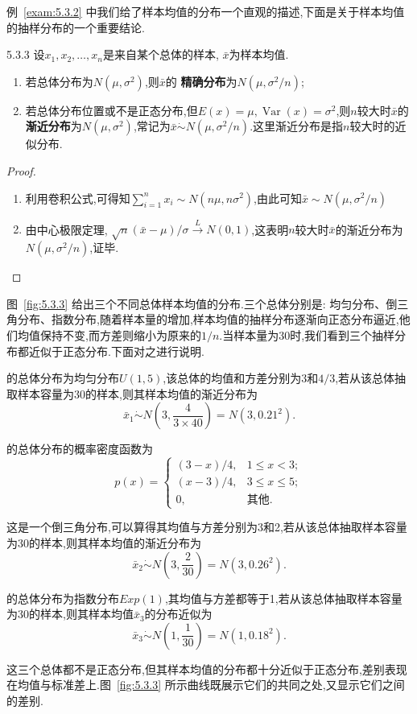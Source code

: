 例~\ref{exam:5.3.2} 中我们给了样本均值的分布一个直观的描述,下面是关于样本均值的抽样分布的一个重要结论.
\begin{theorem}{}{5.3.3}
设$x_1,x_2,\dotsc,x_n$是来自某个总体的样本, $\bar x$为样本均值.
\begin{enumerate}
\item 若总体分布为$N(\mu,\sigma^2)$,则$\bar x$的 \textbf{精确分布}为$N(\mu,\sigma^2/n)$;
\item 若总体分布位置或不是正态分布,但$E(x)=\mu,\operatorname{Var}(x)=\sigma^2$,则$n$较大时$\bar x$的 \textbf{渐近分布}为$N(\mu,\sigma^2)$,常记为$\bar x\dot{\sim}N(\mu,\sigma^2/n)$.这里渐近分布是指$n$较大时的近似分布.
\end{enumerate}
\end{theorem}
\begin{proof}
\begin{enumerate}
\item 利用卷积公式,可得知$\sum_{i=1}^nx_i\sim N(n\mu,n\sigma^2)$,由此可知$\bar x\sim N(\mu,\sigma^2/n)$
\item 由中心极限定理, $\sqrt n(\bar x-\mu)/\sigma\xrightarrow{L}N(0,1)$,这表明$n$较大时$\bar x$的渐近分布为$N(\mu,\sigma^2/n)$,证毕.
\end{enumerate}
\end{proof}
\begin{example}\label{exam:5.3.3}
图~\ref{fig:5.3.3} 给出三个不同总体样本均值的分布.三个总体分别是:
均匀分布、倒三角分布、指数分布,随着样本量的增加,样本均值的抽样分布逐渐向正态分布逼近,他们均值保持不变,而方差则缩小为原来的$1/n$.当样本量为30时,我们看到三个抽样分布都近似于正态分布.下面对之进行说明.

的总体分布为均匀分布$U(1,5)$,该总体的均值和方差分别为$3$和$4/3$,若从该总体抽取样本容量为30的样本,则其样本均值的渐近分布为
\[\bar x_1\dot{\sim}N\left(3,\frac4{3\times40}\right)=N(3,0.21^2).\]

的总体分布的概率密度函数为
\[p(x)=\begin{cases}
(3-x)/4,&1\leq x<3;\\
(x-3)/4,&3\leq x\leq 5;\\
0,&\text{其他}.
\end{cases}\]

这是一个倒三角分布,可以算得其均值与方差分别为3和2,若从该总体抽取样本容量为30的样本,则其样本均值的渐近分布为
\[\bar x_2\dot{\sim} N\left(3,\frac{2}{30}\right)=N(3,0.26^2).\]

的总体分布为指数分布$Exp(1)$,其均值与方差都等于1,若从该总体抽取样本容量为30的样本,则其样本均值$\bar x_3$的分布近似为
\[\bar x_3\dot{\sim}N\left(1,\frac1{30}\right)=N(1,0.18^2).\]

这三个总体都不是正态分布,但其样本均值的分布都十分近似于正态分布,差别表现在均值与标准差上.图~\ref{fig:5.3.3} 所示曲线既展示它们的共同之处,又显示它们之间的差别.
\end{example}
